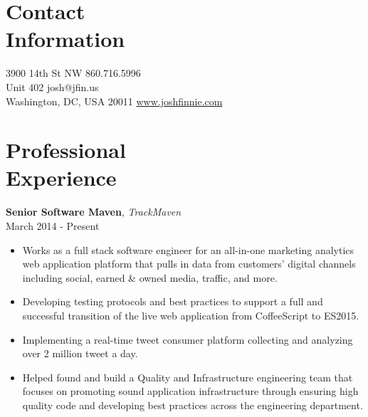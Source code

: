 \documentclass[margin,line,10pt]{resume}
\begin{document}
\begin{resume}

\section{\mysidestyle Contact\\Information\\\vspace{5pt}}

3900 14th St NW                     \hfill 860.716.5996\vspace{0mm}\\
Unit 402                            \hfill josh@jfin.us\vspace{0mm}\\
Washington, DC, USA 20011           \hfill \href{http://www.joshfinnie.com}{www.joshfinnie.com}\vspace{0mm}

\section{\mysidestyle Professional\\Experience\\\vspace{5pt}}

\textbf{Senior Software Maven}, \textsl{TrackMaven}\\March 2014 - Present\vspace{2mm}%
\begin{itemize}
    \item Works as a full stack software engineer for an all-in-one marketing analytics web application platform that pulls in data from customers' digital channels including social, earned \& owned media, traffic, and more.
    \item Developing testing protocols and best practices to support a full and successful transition of the live web application from CoffeeScript to ES2015. 
    \item Implementing a real-time tweet consumer platform collecting and analyzing over 2 million tweet a day. 
    \item Helped found and build a Quality and Infrastructure engineering team that focuses on promoting sound application infrastructure through ensuring high quality code and developing best practices across the engineering department.
\end{itemize}


\end{resume}
\end{document}
